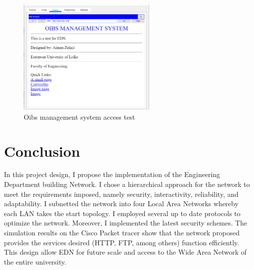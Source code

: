 \documentclass[ a4, 12pt, onecolumn]{IEEEtran}
\begin{document}
\begin{figure}[H]
\centering
    \includegraphics[width=0.6\textwidth]{oibs.png}
    \caption{Oibs management system access test}
    \label{fig:test5}
\end{figure}

\section{Conclusion}
In this project design, I propose the implementation of the Engineering Department building Network. I chose a hierarchical approach for the network to meet the requirements imposed, namely security, interactivity, reliability, and adaptability. I subnetted the network into four Local Area Networks whereby each LAN takes the start topology. I employed several up to date protocols to optimize the network. Moreover, I implemented the latest security schemes. The simulation results on the Cisco Packet tracer show that the network proposed provides the services desired (HTTP, FTP, among others) function efficiently. This design allow EDN for future scale and access to the Wide Area Network of the entire university.
\end{document}
